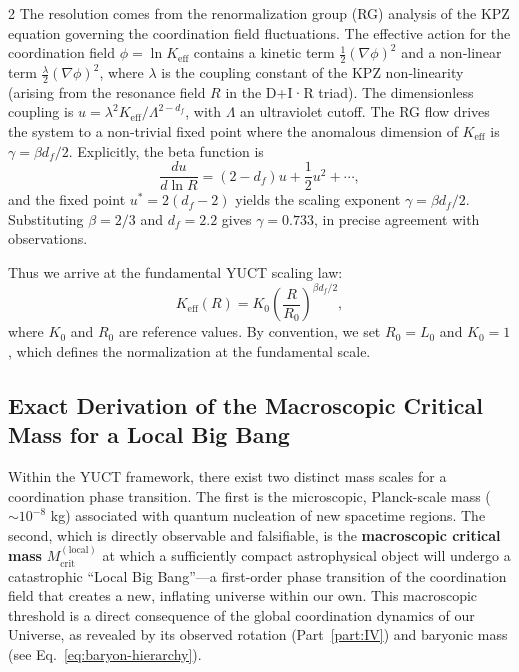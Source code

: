 \documentclass[12pt,a4paper]{article}
\newcommand{\Keff}{K_{\mathrm{eff}}}
\newcommand{\Lzero}{L_0}
\begin{document}
\begin{multicols}{2}
		The resolution comes from the renormalization group (RG) analysis of the KPZ equation governing the coordination field fluctuations. The effective action for the coordination field \(\phi = \ln \Keff\) contains a kinetic term \(\frac{1}{2}(\nabla \phi)^2\) and a non‑linear term \(\frac{\lambda}{2}(\nabla \phi)^2\), where \(\lambda\) is the coupling constant of the KPZ non‑linearity (arising from the resonance field \(R\) in the D+I·R triad). The dimensionless coupling is \(u = \lambda^2 \Keff / \Lambda^{2-d_f}\), with \(\Lambda\) an ultraviolet cutoff. The RG flow drives the system to a non‑trivial fixed point where the anomalous dimension of \(\Keff\) is \(\gamma = \beta d_f / 2\). Explicitly, the beta function is
		\[
		\frac{du}{d\ln R} = (2 - d_f) u + \frac{1}{2} u^2 + \cdots,
		\]
		and the fixed point \(u^* = 2(d_f - 2)\) yields the scaling exponent \(\gamma = \beta d_f / 2\). Substituting \(\beta = 2/3\) and \(d_f = 2.2\) gives \(\gamma = 0.733\), in precise agreement with observations.
		
		Thus we arrive at the fundamental YUCT scaling law:
		\begin{equation}
			\Keff(R) = K_0 \left( \frac{R}{R_0} \right)^{\beta d_f / 2},
			\label{eq:keff-scaling}
		\end{equation}
		where \(K_0\) and \(R_0\) are reference values. By convention, we set \(R_0 = \Lzero\) and \(K_0 = 1\), which defines the normalization at the fundamental scale.
		
	\end{multicols}
	
	\subsection{Exact Derivation of the Macroscopic Critical Mass for a Local Big Bang}
	\label{subsec:Mcrit-macroscopic}
	
	Within the YUCT framework, there exist two distinct mass scales for a coordination phase transition. The first is the microscopic, Planck-scale mass (\(\sim 10^{-8}\) kg) associated with quantum nucleation of new spacetime regions. The second, which is directly observable and falsifiable, is the \textbf{macroscopic critical mass} \(M_{\mathrm{crit}}^{\mathrm{(local)}}\) at which a sufficiently compact astrophysical object will undergo a catastrophic ``Local Big Bang''---a first-order phase transition of the coordination field that creates a new, inflating universe within our own. This macroscopic threshold is a direct consequence of the global coordination dynamics of our Universe, as revealed by its observed rotation (Part~\ref{part:IV}) and baryonic mass (see Eq.~\ref{eq:baryon-hierarchy}).
	
\end{document}
